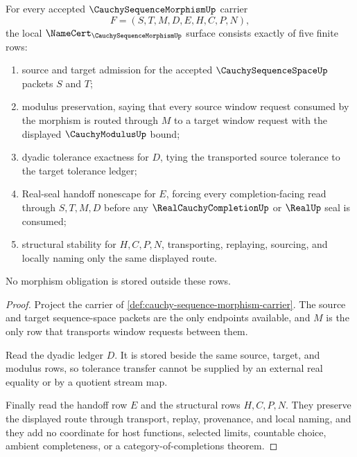 \begin{theorem}
\label{thm:cauchy-sequence-morphism-namecert-obligations}
For every accepted $\CauchySequenceMorphismUp$ carrier
$$
F=(S,T,M,D,E,H,C,P,N),
$$
the local $\NameCert_{\CauchySequenceMorphismUp}$ surface consists exactly of five finite rows:
\begin{enumerate}
\item source and target admission for the accepted $\CauchySequenceSpaceUp$ packets $S$ and $T$;
\item modulus preservation, saying that every source window request consumed by the morphism is routed through $M$ to a target window request with the displayed $\CauchyModulusUp$ bound;
\item dyadic tolerance exactness for $D$, tying the transported source tolerance to the target tolerance ledger;
\item Real-seal handoff nonescape for $E$, forcing every completion-facing read through $S,T,M,D$ before any $\RealCauchyCompletionUp$ or $\RealUp$ seal is consumed;
\item structural stability for $H,C,P,N$, transporting, replaying, sourcing, and locally naming only the same displayed route.
\end{enumerate}
No morphism obligation is stored outside these rows.
\end{theorem}
\begin{proof}
Project the carrier of \autoref{def:cauchy-sequence-morphism-carrier}. The source and target sequence-space packets are the only endpoints available, and $M$ is the only row that transports window requests between them.

Read the dyadic ledger $D$. It is stored beside the same source, target, and modulus rows, so tolerance transfer cannot be supplied by an external real equality or by a quotient stream map.

Finally read the handoff row $E$ and the structural rows $H,C,P,N$. They preserve the displayed route through transport, replay, provenance, and local naming, and they add no coordinate for host functions, selected limits, countable choice, ambient completeness, or a category-of-completions theorem.
\end{proof}

